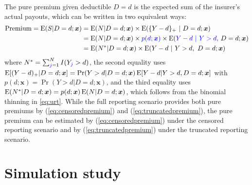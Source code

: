 \documentclass[11pt]{article}
\newcommand{\rev}[1]{{\color{blue}#1}}
\newcommand{\todonote}[1]{{\color{purple}[\textbf{Things to do:} #1]}}
\begin{document}
\rev{The pure premium given deductible $D=d$ is the expected sum of the insurer's actual payouts, which can be written in two equivalent ways:}
\begin{align}
	{\rm Premium} = {\rm E}(S|D=d;\bm{x})&={\rm E}(N|D=d;\bm{x}) \times {\rm E}(\{Y-d\}_+\ |\ D=d;\bm{x})\label{eq:censoredpremium}\\
    &={\rm E}(N|D=d;\bm{x}) \times \rev{p(d;\bm{x})}\times{\rm E}(\rev{Y-d\ |\ Y>d,}\ D=d;\bm{x})\nonumber\\
    &={\rm E}(N^*|D=d;\bm{x}) \times {\rm E}(Y-d\ |\ Y>d,\ D=d;\bm{x})\label{eq:truncatedpremium}
\end{align}
where $N^* = \sum_{\rev{j}=1}^{N}I(Y_{\rev{j}}>d)$\rev{, the second equality uses ${\rm E}[(Y-d)_+|D=d;\bm{x}]=\Pr(Y>d|D=d;\bm{x})\,{\rm E}[Y-d|Y>d,D=d;\bm{x}]$ with $p(d;\bm{x})=\Pr(Y>d|D=d;\bm{x})$, and the third equality uses ${\rm E}(N^*|D=d;\bm{x})=p(d;\bm{x})\,{\rm E}(N|D=d;\bm{x})$, which follows from the binomial thinning in \eqref{eq:urt}}. While \rev{the} full reporting scenario provides both pure premiums by (\ref{eq:censoredpremium}) and (\ref{eq:truncatedpremium}), the pure premium can be estimated by (\ref{eq:censoredpremium}) under \rev{the} censored reporting scenario and \rev{by} (\ref{eq:truncatedpremium}) under \rev{the} truncated reporting scenario.


\section{Simulation study}\label{sec:simulation}

\end{document}
